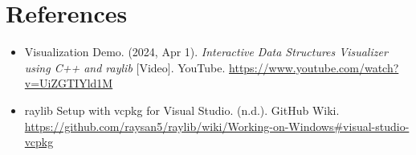 \clearpage
\section*{References}

\begin{itemize}
  \item Visualization Demo. (2024, Apr 1). \textit{Interactive Data Structures Visualizer using C++ and raylib} [Video]. YouTube. \url{https://www.youtube.com/watch?v=UiZGTIYld1M}
  \item raylib Setup with vcpkg for Visual Studio. (n.d.). GitHub Wiki. \url{https://github.com/raysan5/raylib/wiki/Working-on-Windows#visual-studio-vcpkg}
\end{itemize}
